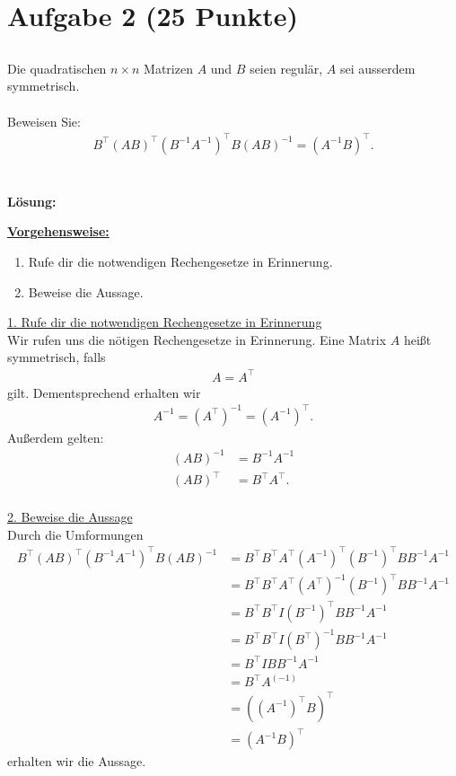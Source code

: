 \section*{Aufgabe 2 (25 Punkte)}
\vspace{0.4cm}
\subsection*{}
Die quadratischen $ n \times n $ Matrizen $ A $ und $ B $ seien regulär, $ A $ sei ausserdem symmetrisch.\\
\\
Beweisen Sie:
\begin{align*}
B^\top (AB)^\top (B^{-1} A^{-1})^\top B (A B)^{-1}
=
(A^{-1} B )^\top.
\end{align*}
\\
\\
\textbf{Lösung:}
\begin{mdframed}
\renewcommand{\labelenumi}{\theenumi.}
\underline{\textbf{Vorgehensweise:}}
\begin{enumerate}
\item Rufe dir die notwendigen Rechengesetze in Erinnerung.
\item Beweise die Aussage.
\end{enumerate}
\end{mdframed}


\underline{1. Rufe dir die notwendigen Rechengesetze in Erinnerung }\\
Wir rufen uns die nötigen Rechengesetze in Erinnerung.
Eine Matrix $ A $ heißt symmetrisch, falls
\begin{align*}
A = A^\top
\end{align*}
gilt. Dementsprechend erhalten wir
\begin{align*}
A^{-1} = (A^\top)^{-1} = (A^{-1})^\top.
\end{align*}
Außerdem gelten:
\begin{align*}
(A B)^{-1} &= B^{-1} A^{-1}\\
(A B)^\top &= B^\top A^\top.
\end{align*}
\ \\
\underline{2. Beweise die Aussage}\\
Durch die Umformungen
\begin{align*}
B^\top (AB)^\top (B^{-1} A^{-1})^\top B (A B)^{-1}
&=
B^\top B^\top A^\top (A^{-1})^\top (B^{-1})^\top B B^{-1} A^{-1}\\
&=
B^\top B^\top A^\top (A^\top)^{-1} (B^{-1})^\top B B^{-1} A^{-1}\\
&=
B^\top B^\top I (B^{-1})^\top B B^{-1} A^{-1}\\
&=
B^\top B^\top I (B^\top)^{-1} B B^{-1} A^{-1}\\
&=
B^\top I B B^{-1} A^{-1}\\
&=
B^\top A^{(-1)}\\
&=
((A^{-1})^\top B)^\top\\
&= (A^{-1} B)^\top
\end{align*}
erhalten wir die Aussage.
\newpage

